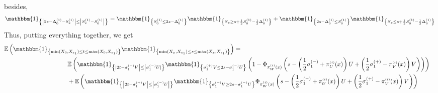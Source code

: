 \documentclass[12pt]{article}
\theoremstyle{Theorem}
\begin{document}
besides,  
\begin{align*}
\mathbbm{1}_{\left\{ \left|2s - \Delta^{(1)}_{0} -  S^{\scriptscriptstyle (1)}_{x}  \right| \leq \left|S^{\scriptscriptstyle (1)}_{x} - S^{\scriptscriptstyle (1)}_{0}\right|\right\}} 
&= \mathbbm{1}_{\left\{  S^{\scriptscriptstyle (1)}_{0} \leq 2s - \Delta^{(1)}_{0}\right\}} \mathbbm{1}_{\left\{ S_{x} \geq s+ \frac{1}{2}S^{\scriptscriptstyle (1)}_{0} - \frac{1}{2}\Delta^{\scriptscriptstyle (1)}_{0}\right\}} + \mathbbm{1}_{\left\{  2s - \Delta^{(1)}_{0} \leq S^{\scriptscriptstyle (1)}_{0} \right\}} \mathbbm{1}_{\left\{ S_{x} \leq  s+ \frac{1}{2}S^{\scriptscriptstyle (1)}_{0} - \frac{1}{2}\Delta^{\scriptscriptstyle (1)}_{0} \right\}} \\
\end{align*} 
Thus, putting everything together, we get 
{\small 
\begin{align*}
\mathbb{E}\left(\mathbbm{1}_{\left\{\min(X_{\scriptscriptstyle 0}, X_{e_1}) \leq t \leq \max(X_{\scriptscriptstyle 0}, X_{e_1})\right\}}\mathbbm{1}_{\left\{\min(X_{x}, X_{e_1}) \leq s \leq \max(X_{x}, X_{e_1}) \right\}}\right) = \\
& \hspace{-10cm} \mathbb{E}\left(\mathbbm{1}_{\left\{|2t - \sigma^{(+)}_{1}V\right| \leq  \left|\sigma^{(-)}_{1}U|\right\}}\mathbbm{1}_{\left\{ \sigma^{(+)}_{1}V  \leq 2s - \sigma^{(-)}_{1}U\right\}} \left(1 - \Phi_{\pi^{\scriptscriptstyle(i)}_{W}(x) }\left(s - \left(\frac{1}{2}\sigma^{(-)}_{1} + \pi^{\scriptscriptstyle(i)}_{U}(x)\right)U  +  \left(\frac{1}{2}\sigma^{(+)}_{1} - \pi^{\scriptscriptstyle(i)}_{V}(x)\right)V\right)\right)\right)\\
& \hspace{-10cm}+ \mathbb{E}\left(\mathbbm{1}_{\left\{\left|2t - \sigma^{(+)}_{1}V\right|\leq  \left|\sigma^{(-)}_{1}U\right|\right\}}\mathbbm{1}_{\left\{ \sigma^{(+)}_{1}V  \geq 2s - \sigma^{(-)}_{1}U\right\}}\Phi_{\pi^{\scriptscriptstyle(i)}_{W}(x) }\left(s - \left(\frac{1}{2}\sigma^{(-)}_{1} + \pi^{\scriptscriptstyle(i)}_{U}(x)\right)U  +  \left(\frac{1}{2}\sigma^{(+)}_{1}- \pi^{\scriptscriptstyle(i)}_{V}(x)\right)V\right) \right)\\\
\end{align*}
}
\end{document}
